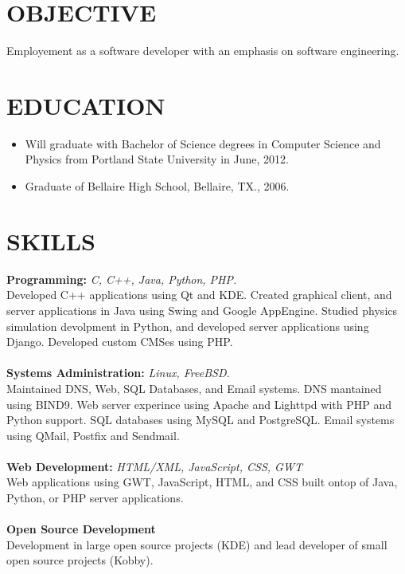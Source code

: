 \documentclass[11pt]{res}
\begin{document}
\address{2030 NW Flanders St. \#103 \\  Portland, OR. 97209 \\  (503) 928-4240 \\  greg@greghaynes.net \\ http://greghaynes.net }

\begin{resume}

\section{OBJECTIVE} Employement as a software developer with an emphasis on software engineering.

\section{EDUCATION} \begin{itemize}
                        \item Will graduate with Bachelor of Science degrees in Computer Science and Physics from Portland State University in June, 2012.
                        \item Graduate of Bellaire High School, Bellaire, TX., 2006.
                    \end{itemize}

\section{SKILLS} {\bf Programming:} \textit{C, C++, Java, Python, PHP.} \\
                   Developed C++ applications using Qt and KDE.  Created graphical client, and server applications in Java using Swing and Google AppEngine.  Studied physics simulation devolpment in Python, and developed server applications using Django.  Developed custom CMSes using PHP. \\
                 \\
                 {\bf Systems Administration:} \textit{Linux, FreeBSD.} \\
                   Maintained DNS, Web, SQL Databases, and Email systems. DNS mantained using BIND9.  Web server experince using Apache and Lighttpd with PHP and Python support.  SQL databases using MySQL and PostgreSQL.  Email systems using QMail, Postfix and Sendmail. \\
                 \\
                 {\bf Web Development:} \textit{HTML/XML, JavaScript, CSS, GWT} \\
                 Web applications using GWT, JavaScript, HTML, and CSS built ontop of Java,  Python, or PHP server applications. \\
                 \\
                 {\bf Open Source Development} \\
                 Development in large open source projects (KDE) and lead developer of small open source projects (Kobby).


\end{resume}
\end{document}
